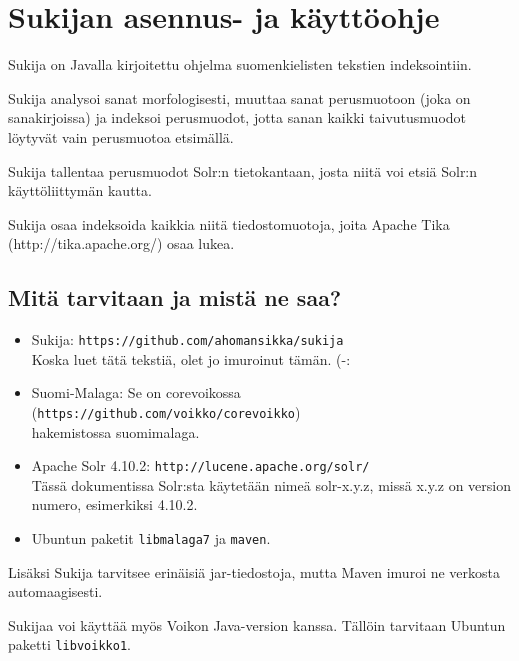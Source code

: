 \documentclass[12pt,a4paper]{scrartcl}
\begin{document}
\pagestyle{fancy}
\setlength{\parindent}{0pt}
\setlength{\parskip}{1ex plus 0.5ex minus 0.2ex}
\section*{Sukijan asennus- ja käyttöohje}

Sukija on Javalla kirjoitettu ohjelma suomenkielisten tekstien
indeksointiin.

Sukija analysoi sanat morfologisesti, muuttaa sanat perusmuotoon (joka
on sanakirjoissa) ja indeksoi perusmuodot, jotta sanan kaikki
taivutusmuodot löytyvät vain perusmuotoa etsimällä.

Sukija tallentaa perusmuodot Solr:n tietokantaan, josta niitä voi
etsiä Solr:n käyttöliittymän kautta.

Sukija osaa indeksoida kaikkia niitä tiedostomuotoja, joita Apache
Tika \\(http://tika.apache.org/) osaa lukea.

\subsection*{Mitä tarvitaan ja mistä ne saa?}

\begin{itemize}

\item Sukija:
      \verb=https://github.com/ahomansikka/sukija= \\
      Koska luet tätä tekstiä, olet jo imuroinut tämän. (-:

\item Suomi-Malaga: Se on corevoikossa
      (\verb=https://github.com/voikko/corevoikko=) \\
      hakemistossa suomimalaga.

\item Apache Solr 4.10.2:
      \verb=http://lucene.apache.org/solr/= \\
      Tässä dokumentissa Solr:sta käytetään nimeä solr-x.y.z,
      missä x.y.z on version numero, esimerkiksi 4.10.2.

\item Ubuntun paketit \verb=libmalaga7= ja \verb=maven=.
\end{itemize}

Lisäksi Sukija tarvitsee erinäisiä jar-tiedostoja, mutta Maven imuroi
ne verkosta automaagisesti.

Sukijaa voi käyttää myös Voikon Java-version kanssa. Tällöin tarvitaan
Ubuntun paketti \verb=libvoikko1=.
\end{document}
